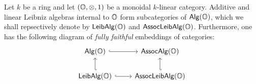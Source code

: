                 \begin{proposition} \label{prop: leibniz_algebra_categories}
                    Let $k$ be a ring and let $(\O, \tensor, 1)$ be a monoidal $k$-linear category. Additive and linear Leibniz algebras internal to $\mathbb{O}$ form subcategories of $\mathsf{Alg}(\mathbb{O})$, which we shall repsectively denote by $\mathsf{Leib}\mathsf{Alg}(\mathbb{O})$ and $\mathsf{Assoc}\mathsf{Leib}\mathsf{Alg}(\mathbb{O})$. Furthermore, one has the following diagram of \textit{fully faithful} embeddings of categories:
                        $$
                            \begin{tikzcd}
                            	{\Alg(\O)} & {\Assoc\Alg(\O)} \\
                            	{\Leib\Alg(\O)} & {\Assoc\Leib\Alg(\O)}
                            	\arrow[hook', from=2-1, to=1-1]
                            	\arrow[hook', from=2-2, to=1-2]
                            	\arrow[hook, from=2-1, to=2-2]
                            	\arrow[hook, from=1-1, to=1-2]
                            \end{tikzcd}
                        $$
                \end{proposition}
